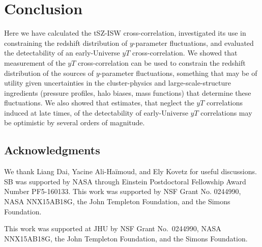 \documentclass[aps,twocolumn,floats,prd,nofootinbib]{revtex4-1}
\begin{document}
\section{Conclusion}

Here we have calculated the tSZ-ISW cross-correlation,
investigated its use in constraining the redshift distribution
of $y$-parameter fluctuations, and evaluated the detectability
of an early-Universe $yT$ cross-correlation.  We showed that
measurement of the $yT$ cross-correlation can be used to
constrain the redshift distribution of the sources of
$y$-parameter fluctuations, something that may be of utility
given uncertainties in the cluster-physics and
large-scale-structure ingredients (pressure profiles, halo
biases, mass functions) that determine these fluctuations.  We
also showed that estimates, that neglect the $yT$
correlations induced at late times, of the detectability of
early-Universe $yT$ correlations may be optimistic by several
orders of magnitude.

\subsection*{Acknowledgments}
 
We thank Liang Dai, Yacine Ali-Ha\"{i}moud, and Ely
Kovetz for useful discussions.  SB was supported by NASA through
Einstein Postdoctoral Fellowship Award Number PF5-160133.  This
work was supported by NSF Grant No. 0244990, NASA NNX15AB18G,
the John Templeton Foundation, and the Simons Foundation.














\begin{acknowledgments}
This work was supported at JHU by NSF Grant No.\
0244990, NASA NNX15AB18G, the John Templeton Foundation, and the
Simons Foundation. 
\end{acknowledgments}
\end{document}
